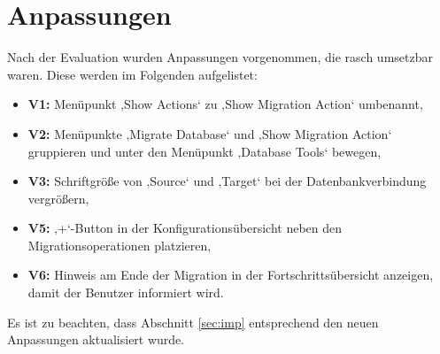 \section{Anpassungen}
Nach der Evaluation wurden Anpassungen vorgenommen, die rasch umsetzbar waren. Diese werden im Folgenden aufgelistet:
\begin{itemize}
	\item \textbf{V1:} Menüpunkt ‚Show Actions‘ zu ‚Show Migration Action‘ umbenannt,
	\item \textbf{V2:} Menüpunkte ‚Migrate Database‘ und ‚Show Migration Action‘ gruppieren und unter den Menüpunkt ‚Database Tools‘ bewegen,
	\item \textbf{V3:} Schriftgröße von ‚Source‘ und ‚Target‘ bei der Datenbankverbindung vergrößern, 
	\item \textbf{V5:} ‚+‘-Button in der Konfigurationsübersicht neben den Migrationsoperationen platzieren,
	\item \textbf{V6:} Hinweis am Ende der Migration in der Fortschrittsübersicht anzeigen, damit der Benutzer informiert wird.
\end{itemize}
Es ist zu beachten, dass Abschnitt \ref{sec:imp} entsprechend den neuen Anpassungen aktualisiert wurde.